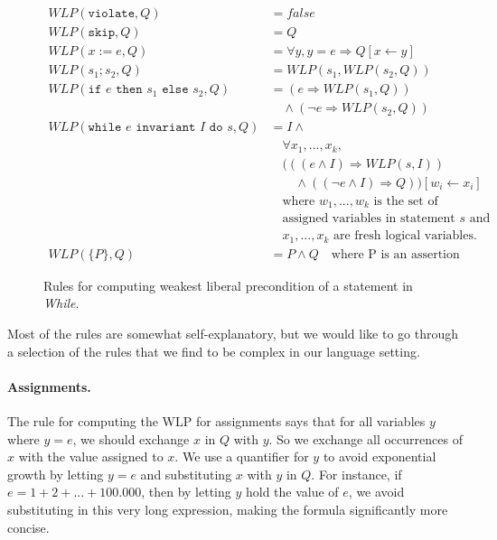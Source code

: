 \begin{figure}
\begin{align*}
WLP(\texttt{violate}, Q) &= false \\
WLP(\texttt{skip}, Q) &= Q \\
WLP(x:=e,Q) &= \forall y, y = e \Rightarrow Q[x \leftarrow y] \\
WLP(s_1;s_2, Q) &= WLP(s_1, WLP(s_2, Q)) \\
WLP(\texttt{if } e \texttt{ then } s_1 \texttt{ else } s_2, Q) &= (e \Rightarrow WLP(s_1, Q)) \\
    &\quad \land (\neg e \Rightarrow WLP(s_2, Q)) \\
WLP(\texttt{while } e \texttt{ invariant } I \texttt{ do } s, Q) &= 
    I \land \\
&\quad \forall x_1, ..., x_k, \\
&\quad (((e \land I) \Rightarrow WLP(s, I)) \\
&\quad \quad \land (( \neg e \land I) \Rightarrow Q))
    [w_i \leftarrow x_i] \\
&\quad \text{where } w_1, ..., w_k \text{ is the set of} \\
&\quad \text{assigned variables in statement } s \text{ and } \\
&\quad x_1, ..., x_k \text{ are fresh logical variables.} \\
WLP(\{P\}, Q) &= P \land Q \quad \text{where P is an assertion}
\end{align*}
\caption{Rules for computing weakest liberal precondition of a statement in \textit{While}\cite{wlp}.}
\label{fig:wlp}
\end{figure}

Most of the rules are somewhat self-explanatory, but we would like to go through a selection of the rules that we find to be complex in our language setting.

\paragraph{Assignments.}
The rule for computing the WLP for assignments says that for all variables $y$ where $y = e$, we should exchange $x$ in $Q$ with $y$. So we exchange all occurrences of $x$ with the value assigned to $x$.
We use a quantifier for $y$ to avoid exponential growth by letting $y=e$ and substituting $x$ with $y$ in $Q$.
For instance, if $e=1+2+...+100.000$, then by letting $y$ hold the value of $e$, we avoid substituting in this very long expression, making the formula significantly more concise.

